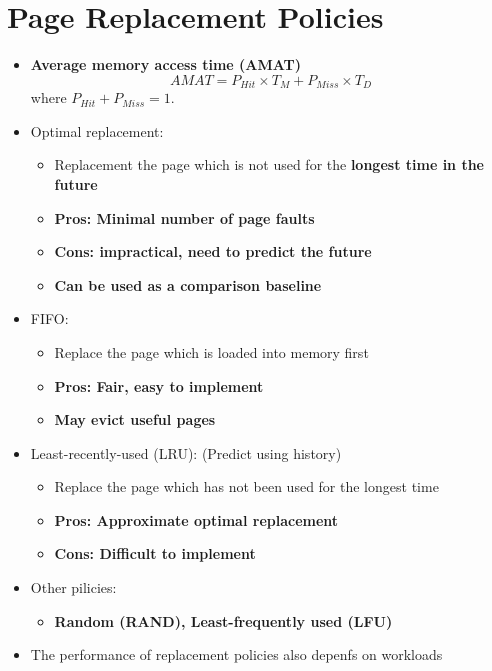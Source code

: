 \documentclass[a4paper,11pt,english]{article}
\begin{document}
\section*{Page Replacement Policies}
\begin{itemize}
    \item \textbf{\color{blue} Average memory access time (AMAT)}
        \[
            AMAT = P_{Hit} \times T_M + P_{Miss} \times T_D 
        \]
    where $P_{Hit} + P_{Miss} = 1$.
    \item Optimal replacement:
        \begin{itemize}
            \item Replacement the page which is not used for the \textbf{\color{blue} longest time in the future}
            \item \textbf{\color{blue} Pros: Minimal number of page faults}
            \item \textbf{\color{red} Cons: impractical, need to predict the future}
            \item \textbf{Can be used as a comparison baseline}
        \end{itemize}
    \item FIFO:
        \begin{itemize}
            \item Replace the page which is loaded into memory first
            \item \textbf{\color{blue} Pros: Fair, easy to implement}
            \item \textbf{\color{red} May evict useful pages}
        \end{itemize}
    \item Least-recently-used (LRU): (Predict using history)
        \begin{itemize}
            \item Replace the page which has not been used for the longest time
            \item \textbf{\color{blue} Pros: Approximate optimal replacement}
            \item \textbf{\color{red} Cons: Difficult to implement}
        \end{itemize}
    \item Other pilicies:
        \begin{itemize}
            \item \textbf{\color{blue} Random (RAND), Least-frequently used (LFU)}
        \end{itemize}
    \item The performance of replacement policies also depenfs on workloads

\end{itemize}
\end{document}
